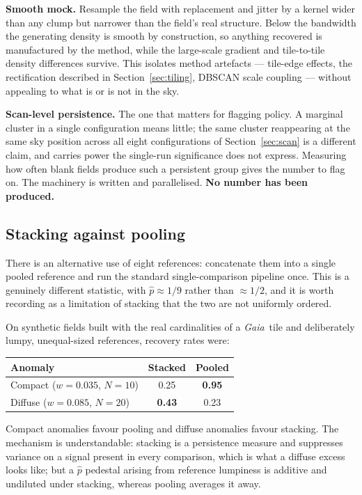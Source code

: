 \documentclass[11pt,a4paper]{article}
\newcommand{\phat}{\hat{p}}                  %
\newcommand{\phat}{\hat{p}}
\newcommand{\Gaia}{\textit{Gaia}}
\begin{document}
\textbf{Smooth mock.} Resample the field with replacement and jitter by a kernel wider than any
clump but narrower than the field's real structure. Below the bandwidth the generating density is
smooth by construction, so anything recovered is manufactured by the method, while the large-scale
gradient and tile-to-tile density differences survive. This isolates method artefacts --- tile-edge
effects, the rectification described in Section~\ref{sec:tiling}, DBSCAN scale coupling --- without
appealing to what is or is not in the sky.

\textbf{Scan-level persistence.} The one that matters for flagging policy. A marginal cluster in a
single configuration means little; the same cluster reappearing at the same sky position across all
eight configurations of Section~\ref{sec:scan} is a different claim, and carries power the
single-run significance does not express. Measuring how often blank fields produce such a
persistent group gives the number to flag on. The machinery is written and parallelised.
\textbf{No number has been produced.}

\subsection{Stacking against pooling}
\label{sec:stackpool}

There is an alternative use of eight references: concatenate them into a single pooled reference
and run the standard single-comparison pipeline once. This is a genuinely different statistic, with
$\phat \approx 1/9$ rather than $\approx 1/2$, and it is worth recording as a limitation of
stacking that the two are not uniformly ordered.

On synthetic fields built with the real cardinalities of a \Gaia\ tile and deliberately lumpy,
unequal-sized references, recovery rates were:

\begin{table}[h]
\centering\small
\begin{tabular}{@{}lcc@{}}
\toprule
Anomaly & Stacked & Pooled\\
\midrule
Compact ($w = 0.035$, $N = 10$) & 0.25 & \textbf{0.95}\\
Diffuse ($w = 0.085$, $N = 20$) & \textbf{0.43} & 0.23\\
\bottomrule
\end{tabular}
\end{table}

Compact anomalies favour pooling and diffuse anomalies favour stacking. The mechanism is
understandable: stacking is a persistence measure and suppresses variance on a signal present in
every comparison, which is what a diffuse excess looks like; but a $\phat$ pedestal arising from
reference lumpiness is additive and undiluted under stacking, whereas pooling averages it away.
\end{document}

